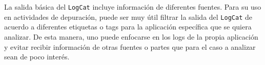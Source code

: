 La salida b\'asica del \texttt{LogCat} incluye informaci\'on de diferentes fuentes. Para su uso en actividades de depuraci\'on, puede ser muy \'util filtrar la salida del \texttt{LogCat} de acuerdo a diferentes etiquetas o tags para la aplicaci\'on espec\'ifica que se quiera analizar. De esta manera, uno puede enfocarse en los logs de la propia aplicaci\'on y evitar recibir informaci\'on de otras fuentes o partes que para el caso a analizar sean de poco inter\'es.
